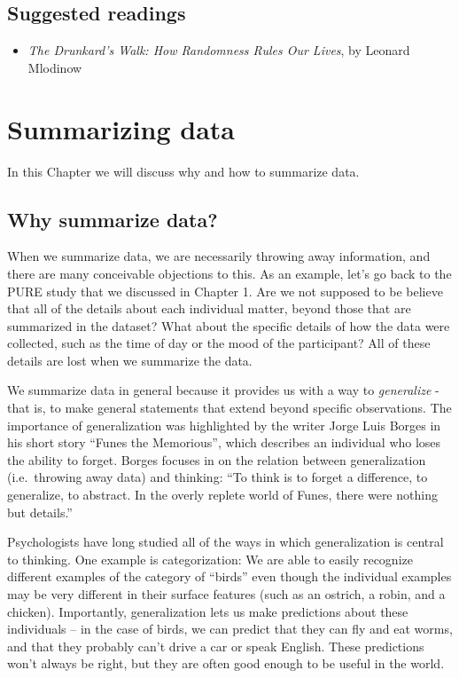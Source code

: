 \documentclass[]{book}
\providecommand{\tightlist}{%
  \setlength{\itemsep}{0pt}\setlength{\parskip}{0pt}}
\theoremstyle{definition}
\theoremstyle{definition}
\theoremstyle{definition}
\theoremstyle{remark}
\begin{document}
\section{Suggested readings}\label{suggested-readings-2}

\begin{itemize}
\tightlist
\item
  \emph{The Drunkard's Walk: How Randomness Rules Our Lives}, by Leonard
  Mlodinow
\end{itemize}

\chapter{Summarizing data}\label{summarizing-data}

In this Chapter we will discuss why and how to summarize data.

\section{Why summarize data?}\label{why-summarize-data}

When we summarize data, we are necessarily throwing away information,
and there are many conceivable objections to this. As an example, let's
go back to the PURE study that we discussed in Chapter 1. Are we not
supposed to be believe that all of the details about each individual
matter, beyond those that are summarized in the dataset? What about the
specific details of how the data were collected, such as the time of day
or the mood of the participant? All of these details are lost when we
summarize the data.

We summarize data in general because it provides us with a way to
\emph{generalize} - that is, to make general statements that extend
beyond specific observations. The importance of generalization was
highlighted by the writer Jorge Luis Borges in his short story ``Funes
the Memorious'', which describes an individual who loses the ability to
forget. Borges focuses in on the relation between generalization
(i.e.~throwing away data) and thinking: ``To think is to forget a
difference, to generalize, to abstract. In the overly replete world of
Funes, there were nothing but details.''

Psychologists have long studied all of the ways in which generalization
is central to thinking. One example is categorization: We are able to
easily recognize different examples of the category of ``birds'' even
though the individual examples may be very different in their surface
features (such as an ostrich, a robin, and a chicken). Importantly,
generalization lets us make predictions about these individuals -- in
the case of birds, we can predict that they can fly and eat worms, and
that they probably can't drive a car or speak English. These predictions
won't always be right, but they are often good enough to be useful in
the world.
\end{document}
